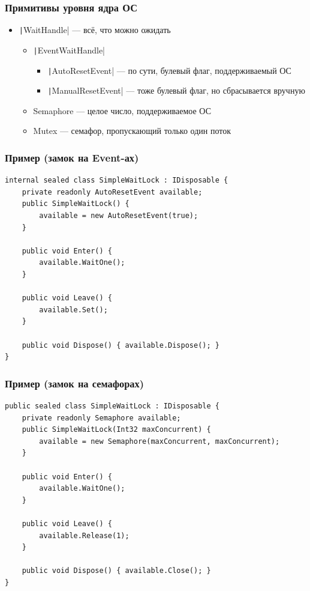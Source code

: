 \documentclass[xetex,mathserif,serif]{beamer}
\begin{document}
	\begin{frame}
		\frametitle{Примитивы уровня ядра ОС}
		\begin{itemize}
			\item \texttt|WaitHandle| --- всё, что можно ожидать
			\begin{itemize}
				\item \texttt|EventWaitHandle|
				\begin{itemize}
					\item \texttt|AutoResetEvent| --- по сути, булевый флаг, поддерживаемый ОС
					\item \texttt|ManualResetEvent| --- тоже булевый флаг, но сбрасывается вручную
				\end{itemize}
				\item Semaphore --- целое число, поддерживаемое ОС
				\item Mutex --- семафор, пропускающий только один поток
			\end{itemize}
		\end{itemize}
	\end{frame}

	\begin{frame}[fragile]
		\frametitle{Пример (замок на Event-ах)}
		\begin{small}
			\begin{verbatim}
internal sealed class SimpleWaitLock : IDisposable {
    private readonly AutoResetEvent available;
    public SimpleWaitLock() {
        available = new AutoResetEvent(true); 
    }

    public void Enter() {
        available.WaitOne();
    }

    public void Leave() {
        available.Set();
    }

    public void Dispose() { available.Dispose(); }
}
			\end{verbatim}
		\end{small}
	\end{frame}

	\begin{frame}[fragile]
		\frametitle{Пример (замок на семафорах)}
		\begin{small}
			\begin{verbatim}
public sealed class SimpleWaitLock : IDisposable {
    private readonly Semaphore available;
    public SimpleWaitLock(Int32 maxConcurrent) {
        available = new Semaphore(maxConcurrent, maxConcurrent);
    }

    public void Enter() {
        available.WaitOne();
    }

    public void Leave() {
        available.Release(1);
    }

    public void Dispose() { available.Close(); }
}
			\end{verbatim}
		\end{small}
	\end{frame}
\end{document}
